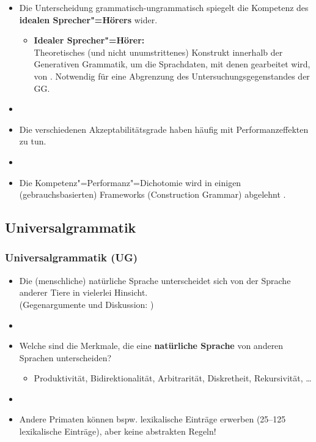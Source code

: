 \begin{frame}

\begin{itemize}

	\item Die Unterscheidung grammatisch-ungrammatisch spiegelt die Kompetenz des \textbf{idealen Sprecher"=Hörers} wider.
	\begin{itemize}
		\item [\ras] \textbf{Idealer Sprecher"=Hörer:}\\
			Theoretisches (und nicht unumstrittenes) Konstrukt innerhalb der Generativen Grammatik, um die Sprachdaten, mit denen gearbeitet wird, von . Notwendig für eine Abgrenzung des Untersuchungsgegenstandes der GG.
	\end{itemize}
\item []
	\item Die verschiedenen Akzeptabilitätsgrade haben häufig mit Performanzeffekten zu tun.
	\item []
	\item Die Kompetenz"=Performanz"=Dichotomie wird in einigen (gebrauchsbasierten) Frameworks (\zB Construction Grammar) abgelehnt \citep[vgl.][]{MuellerS15b, Nolda&Co14a}. 
\end{itemize}

\end{frame}


\subsection{Universalgrammatik}


\begin{frame}
\frametitle{Universalgrammatik (UG)}

\begin{itemize}

	\item Die (menschliche) natürliche Sprache unterscheidet sich von der Sprache anderer Tiere in vielerlei Hinsicht. \citep[vgl. \zB ][]{Hockett60a, Pinker95a}\\
	(Gegenargumente und Diskussion: \citet{Evans&Levinson09a, MuellerS15b})
	\item[]
	\item Welche sind die Merkmale, die eine \textbf{natürliche Sprache} von anderen Sprachen unterscheiden? 
	\begin{itemize}
		\item Produktivität, Bidirektionalität, Arbitrarität, Diskretheit, Rekursivität, \dots \citep[vgl.][]{Luedeling2009}
	\end{itemize}
	\item[]
	\item Andere Primaten können bspw. lexikalische Einträge erwerben (25--125 lexikalische Einträge), aber keine abstrakten Regeln!
\end{itemize}

\end{frame}


